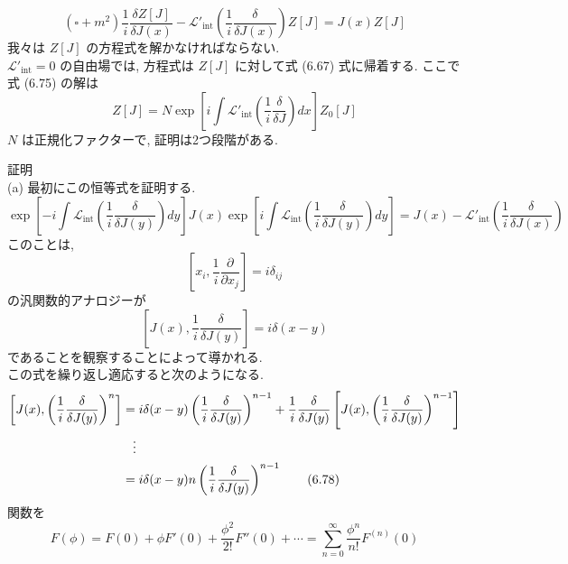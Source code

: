 \documentclass[a4paper,12pt]{article}
\begin{document}
\begin{equation*}
    (\square + m^2)\frac{1}{i}\frac{\delta Z[J]}{\delta J(x)} - \mathcal{L}'_{\textrm{int}}\left( \frac{1}{i}\frac{\delta}{\delta J(x)} \right)Z[J] = J(x)Z[J] \tag{6.75}
\end{equation*}
我々は $Z[J]$ の方程式を解かなければならない.\\
$\mathcal{L}'_{\textrm{int}} = 0$ の自由場では, 方程式は $Z[J]$ に対して式 (6.67) 式に帰着する. ここで式 (6.75) の解は
\begin{equation*}
    Z[J] = N \exp\left[ i\int \mathcal{L}'_{\textrm{int}}\left( \frac{1}{i}\frac{\delta}{\delta J} \right)dx \right]Z_0[J] \tag{6.76}
\end{equation*}
$N$ は正規化ファクターで, 証明は2つ段階がある.\par
証明\\
(a) 最初にこの恒等式を証明する.
\begin{equation*}
    \exp\left[ -i\int \mathcal{L}_{\textrm{int}} \left( \frac{1}{i}\frac{\delta}{\delta J(y)} \right)dy \right]J(x) \exp\left[ i\int \mathcal{L}_{\textrm{int}} \left( \frac{1}{i}\frac{\delta}{\delta J(y)} \right)dy \right] = J(x) - \mathcal{L}'_{\textrm{int}}\left( \frac{1}{i}\frac{\delta}{\delta J(x)} \right) \tag{6.77}
\end{equation*}
このことは,
\begin{equation*}
    \left[ x_i, \frac{1}{i}\frac{\partial}{\partial x_j} \right] = i\delta_{ij}
\end{equation*}
の汎関数的アナロジーが
\begin{equation*}
    \left[ J(x), \frac{1}{i}\frac{\delta}{\delta J(y)} \right] = i\delta (x-y)
\end{equation*}
であることを観察することによって導かれる.\\
この式を繰り返し適応すると次のようになる.
\begin{align*}
    \left[ J(x), \left( \frac{1}{i}\frac{\delta}{\delta J(y)} \right)^n \right] &= i\delta(x-y)\left( \frac{1}{i}\frac{\delta}{\delta J(y)} \right)^{n-1} + \frac{1}{i}\frac{\delta}{\delta J(y)}\left[ J(x), \left( \frac{1}{i}\frac{\delta}{\delta J(y)} \right)^{n-1} \right]\\
    &\hspace{0.3cm}\vdots\\
    &=  i\delta(x-y)n\left( \frac{1}{i}\frac{\delta}{\delta J(y)} \right)^{n-1} \tag{6.78}
\end{align*}
関数を
\begin{equation*}
    F(\phi) = F(0) + \phi F'(0) + \frac{\phi^2}{2!}F''(0) + \cdots = \sum_{n=0}^{\infty}\frac{\phi^n}{n!}F^{(n)}(0)
\end{equation*}
\end{document}
